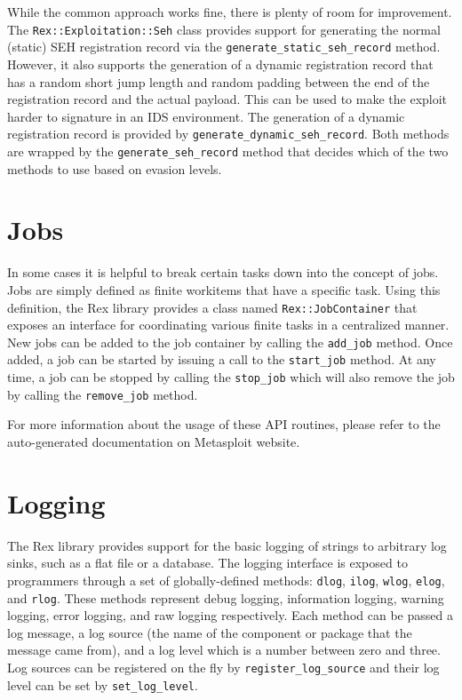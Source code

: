 \documentclass{report}
\begin{document}
\par
While the common approach works fine, there is plenty of room for
improvement.  The \texttt{Rex::Exploitation::Seh} class provides
support for generating the normal (static) SEH registration record
via the \texttt{generate\_static\_seh\_record} method.  However, it
also supports the generation of a dynamic registration record that
has a random short jump length and random padding between the end of
the registration record and the actual payload.  This can be used to
make the exploit harder to signature in an IDS environment.  The
generation of a dynamic registration record is provided by
\texttt{generate\_dynamic\_seh\_record}.  Both methods are wrapped
by the \texttt{generate\_seh\_record} method that decides which of
the two methods to use based on evasion levels.

    \section{Jobs}
    \label{rex-jobs}

\par
In some cases it is helpful to break certain tasks down into the
concept of jobs.  Jobs are simply defined as finite workitems that
have a specific task.  Using this definition, the Rex library
provides a class named \texttt{Rex::JobContainer} that exposes an
interface for coordinating various finite tasks in a centralized
manner. New jobs can be added to the job container by calling the
\texttt{add\_job} method.  Once added, a job can be started by
issuing a call to the \texttt{start\_job} method.  At any time, a
job can be stopped by calling the \texttt{stop\_job} which will also
remove the job by calling the \texttt{remove\_job} method.

\par
For more information about the usage of these API routines, please
refer to the auto-generated documentation on Metasploit website.

    \section{Logging}

\par
The Rex library provides support for the basic logging of strings to
arbitrary log sinks, such as a flat file or a database.  The logging
interface is exposed to programmers through a set of
globally-defined methods: \texttt{dlog}, \texttt{ilog},
\texttt{wlog}, \texttt{elog}, and \texttt{rlog}.  These methods
represent debug logging, information logging, warning logging, error
logging, and raw logging respectively.  Each method can be passed a
log message, a log source (the name of the component or package that
the message came from), and a log level which is a number between
zero and three.  Log sources can be registered on the fly by
\texttt{register\_log\_source} and their log level can be set by
\texttt{set\_log\_level}.
\end{document}

